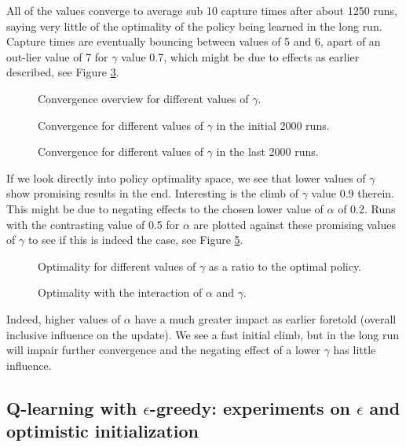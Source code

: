 \documentclass[paper=a4, fontsize=11pt]{scrartcl}
\numberwithin{equation}{section}		%
\numberwithin{figure}{section}			%
\numberwithin{table}{section}				%
\begin{document}
All of the values converge to average sub 10 capture times after about 1250 runs, saying very little of the optimality of the policy being learned in the long run. Capture times are eventually bouncing between values of 5 and 6, apart of an out-lier value of 7 for $\gamma$ value 0.7, which might be due to effects as earlier described, see Figure \ref{figure:gammalast20}.
\begin{figure}[H] \centering
\caption{Convergence overview for different values of $\gamma$.} 
\label{figure:gammaOverview}
\end{figure}
\begin{figure}[H] \centering
\caption{Convergence for different values of $\gamma$ in the initial 2000 runs.} 
\label{figure:gammafirst20}
\end{figure}
\begin{figure}[H] \centering
\caption{Convergence for different values of $\gamma$ in the last 2000 runs.} 
\label{figure:gammalast20}
\end{figure}
If we look directly into policy optimality space, we see that lower values of $\gamma$ show promising results in the end. Interesting is the climb of $\gamma$ value 0.9 therein. This might be due to negating effects to the chosen lower value of $\alpha$ of 0.2. Runs with the contrasting value of 0.5 for $\alpha$ are plotted against these promising values of $\gamma$ to see if this is indeed the case, see Figure \ref{figure:alphagammaOpti}.
\begin{figure}[H] \centering
\caption{Optimality for different values of $\gamma$ as a ratio to the optimal policy.} 
\label{figure:gammaOpti}
\end{figure}
\begin{figure}[H] \centering
\caption{Optimality with the interaction of $\alpha$ and $\gamma$.} 
\label{figure:alphagammaOpti}
\end{figure}
Indeed, higher values of $\alpha$ have a much greater impact as earlier foretold (overall inclusive influence on the update). We see a fast initial climb, but in the long run will impair further convergence and the negating effect of a lower $\gamma$ has little influence.

\subsection{Q-learning with $\epsilon$-greedy: experiments on $\epsilon$ and optimistic initialization}
\end{document}
